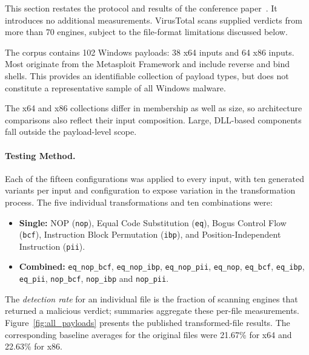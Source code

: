 \documentclass[runningheads]{llncs}
\begin{document}
This section restates the protocol and results of the conference paper~\cite{zone_secrypt_2026}. It introduces no additional measurements. VirusTotal scans supplied verdicts from more than 70 engines, subject to the file-format limitations discussed below.

The corpus contains 102 Windows payloads: 38 x64 inputs and 64 x86 inputs. Most originate from the Metasploit Framework and include reverse and bind shells. This provides an identifiable collection of payload types, but does not constitute a representative sample of all Windows malware.

The x64 and x86 collections differ in membership as well as size, so
architecture comparisons also reflect their input composition. Large,
DLL-based components fall outside the payload-level scope.

\paragraph{Testing Method.}
Each of the fifteen configurations was applied to every input, with ten generated variants per input and configuration to expose variation in the transformation process. The five individual transformations and ten combinations were:

\begin{itemize}
    \item \textbf{Single:} NOP (\texttt{nop}), Equal Code Substitution (\texttt{eq}), Bogus Control Flow (\texttt{bcf}), Instruction Block Permutation (\texttt{ibp}), and Position-Independent Instruction (\texttt{pii}).
    \item \textbf{Combined:} \texttt{eq\_nop\_bcf}, \texttt{eq\_nop\_ibp}, \texttt{eq\_nop\_pii}, \texttt{eq\_nop}, \texttt{eq\_bcf}, \texttt{eq\_ibp}, \texttt{eq\_pii}, \texttt{nop\_bcf}, \texttt{nop\_ibp} and \texttt{nop\_pii}.
\end{itemize}

The \emph{detection rate} for an individual file is the fraction of scanning engines that returned a malicious verdict; summaries aggregate these per-file measurements. Figure~\ref{fig:all_payloads} presents the published transformed-file results. The corresponding baseline averages for the original files were 21.67\% for x64 and 22.63\% for x86.
\end{document}
